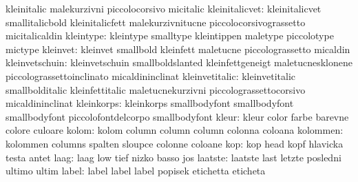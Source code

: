                            kleinitalic               malekurzivni
                           piccolocorsivo            micitalic
           kleinitalicvet: kleinitalicvet            smallitalicbold
                           kleinitalicfett           malekurzivnitucne
                           piccolocorsivograssetto   micitalicaldin
                kleintype: kleintype                 smalltype
                           kleintippen               maletype
                           piccolotype               mictype
                 kleinvet: kleinvet                  smallbold
                           kleinfett                 maletucne
                           piccolograssetto          micaldin
           kleinvetschuin: kleinvetschuin            smallboldslanted
                           kleinfettgeneigt          maletucnesklonene
                           piccolograssettoinclinato micaldininclinat
           kleinvetitalic: kleinvetitalic            smallbolditalic
                           kleinfettitalic           maletucnekurzivni
                           piccolograssettocorsivo   micaldininclinat
               kleinkorps: kleinkorps                smallbodyfont
                           smallbodyfont             smallbodyfont
                           piccolofontdelcorpo       smallbodyfont %
                    kleur: kleur                     color
                           farbe                     barevne
                           colore                    culoare
                    kolom: kolom                     column
                           column                    column
                           colonna                   coloana %
                 kolommen: kolommen                  columns
                           spalten                   sloupce
                           colonne                   coloane
                      kop: kop                       head
                           kopf                      hlavicka
                           testa                     antet %
                     laag: laag                      low
                           tief                      nizko
                           basso                     jos
                  laatste: laatste                   last
                           letzte                    posledni
                           ultimo                    ultim
                    label: label                     label
                           label                     popisek
                           etichetta                 eticheta
